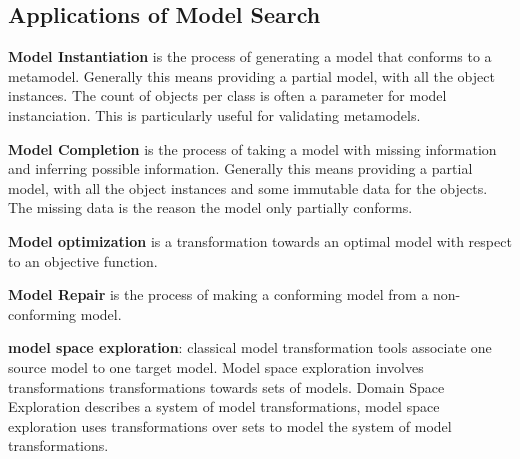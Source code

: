 \subsection{Applications of Model Search}

\noindent
\textbf{Model Instantiation} is the process of generating a model that conforms to a metamodel.
Generally this means providing a partial model, with all the object instances.
The count of objects per class is often a parameter for model instanciation. 
This is particularly useful for validating metamodels.

\noindent
\textbf{Model Completion} is the process of taking a model with missing information and inferring possible information. 
Generally this means providing a partial model, with all the object instances and some immutable data for the objects.
The missing data is the reason the model only partially conforms.

\noindent
\textbf{Model optimization} is a transformation towards an optimal model with respect to an objective function. 

\noindent
\textbf{Model Repair} is the process of making a conforming model from a non-conforming model.

\noindent
\textbf{model space exploration}: classical model transformation tools associate one source model to one target model.
Model space exploration involves transformations transformations towards sets of models.
Domain Space Exploration describes a system of model transformations, model space exploration uses transformations over sets to model the system of model transformations.